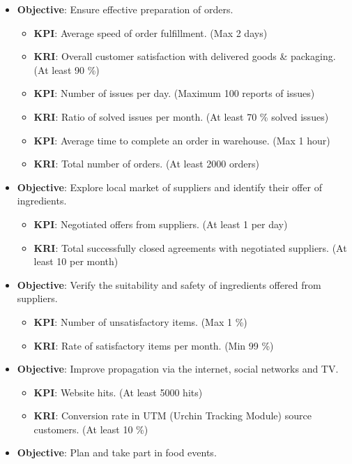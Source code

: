 \documentclass[11pt,a4paper]{article}
\begin{document}
\begin{itemize}
    \item \textbf{Objective}: Ensure effective preparation of orders.
    \begin{itemize}
        \item \textbf{KPI}: Average speed of order fulfillment. (Max 2 days)
        \item \textbf{KRI}: Overall customer satisfaction with delivered goods \& packaging. (At least 90 \%)
        \item \textbf{KPI}: Number of issues per day. (Maximum 100 reports of issues)
        \item \textbf{KRI}: Ratio of solved issues per month. (At least 70 \% solved issues)
        \item \textbf{KPI}: Average time to complete an order in warehouse. (Max 1 hour)
        \item \textbf{KRI}: Total number of orders. (At least 2000 orders)
    \end{itemize}
    \item \textbf{Objective}: Explore local market of suppliers and identify their offer of ingredients.
    \begin{itemize}
        \item \textbf{KPI}: Negotiated offers from suppliers. (At least 1 per day)
        \item \textbf{KRI}: Total successfully closed agreements with negotiated suppliers. (At least 10 per month)
    \end{itemize}
    \item \textbf{Objective}: Verify the suitability and safety of ingredients offered from suppliers.
    \begin{itemize}
        \item \textbf{KPI}: Number of unsatisfactory items. (Max 1 \%)
        \item \textbf{KRI}: Rate of satisfactory items per month. (Min 99 \%)
    \end{itemize}
    \item \textbf{Objective}: Improve propagation via the internet, social networks and TV.
    \begin{itemize}
        \item \textbf{KPI}: Website hits. (At least 5000 hits)
        \item \textbf{KRI}: Conversion rate in UTM (Urchin Tracking Module) source customers. (At least 10 \%)
    \end{itemize}
    \item \textbf{Objective}: Plan and take part in food events.

\end{itemize}
\end{document}
